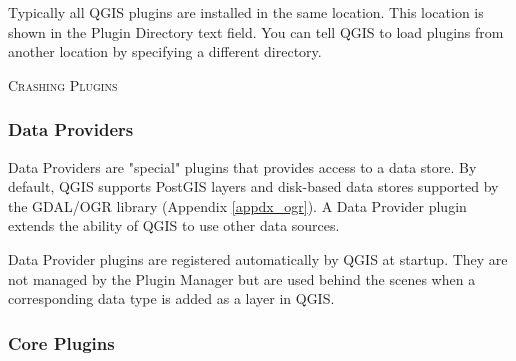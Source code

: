 
Typically all QGIS plugins are installed in the same location.
This location is shown in the Plugin Directory text field.
You can tell QGIS to load plugins from another location by specifying a different directory.

\begin{Tip}\caption{\textsc{Crashing Plugins}}
\end{Tip} 

\subsubsection{Data Providers}

Data Providers are "special" plugins that provides access to a data store.
By default, QGIS supports PostGIS layers and disk-based data stores supported by the GDAL/OGR library (Appendix \ref{appdx_ogr}).
A Data Provider plugin extends the ability of QGIS to use other data sources.

Data Provider plugins are registered automatically by QGIS at startup.
They are not managed by the Plugin Manager but are used behind the scenes when a corresponding data type is added as a layer in QGIS.

\subsubsection{Core Plugins}\label{sec:core_plugins}

